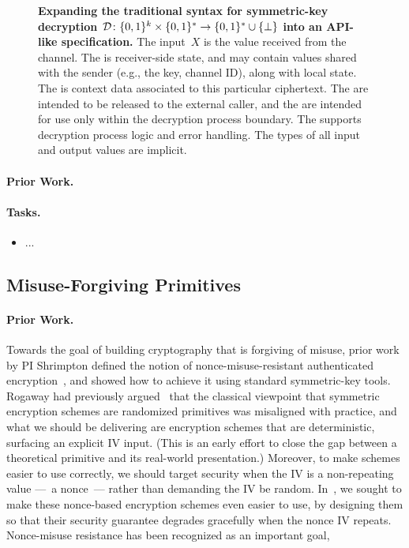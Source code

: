 \begin{figure}
\centering
{}
\caption{{\bf Expanding the traditional syntax for symmetric-key decryption $\mathcal{D}
  \colon\{0,1\}^k \times \{0,1\}^* \to \{0,1\}^* \cup \{\bot\}$ into an
  API-like specification.} The input~$X$ is the value received from the
  channel.  The  is
  receiver-side state, and may contain values shared with the sender
  (e.g., the key, channel ID), along with local state.  The
   is context data associated to this particular
  ciphertext. The  are intended to be released
  to the external caller, and the  are intended
  for use only within the decryption process boundary.  The
   supports decryption process logic and error
  handling.  
  The types of all input and output values are implicit.}
\label{fig:syntax-api-example}
\end{figure}

\paragraph{Prior Work.} 


\paragraph{Tasks.}
\begin{itemize}
\item ...
\end{itemize}


\subsection{Misuse-Forgiving Primitives}

\paragraph{Prior Work.}
Towards the goal of building cryptography that is forgiving of misuse, prior
work by PI Shrimpton defined the notion of nonce-misuse-resistant authenticated
encryption~\cite{RS06}, and showed how to achieve it using standard
symmetric-key tools.  Rogaway had previously argued~\cite{xxx} that the
classical viewpoint that symmetric encryption schemes are randomized primitives
was misaligned with practice, and what we should be delivering are encryption
schemes that are deterministic, surfacing an explicit IV input. (This is an
early effort to close the gap between a theoretical primitive and its real-world
presentation.)  Moreover, to make schemes easier to use correctly, we should
target security when the IV is a non-repeating value ---~a nonce~--- rather than
demanding the IV be random.  In~\cite{RS06}, we sought to make these nonce-based
encryption schemes even easier to use, by designing them so that their security
guarantee degrades gracefully when the nonce IV repeats.  Nonce-misuse
resistance has been recognized as an important goal,  

